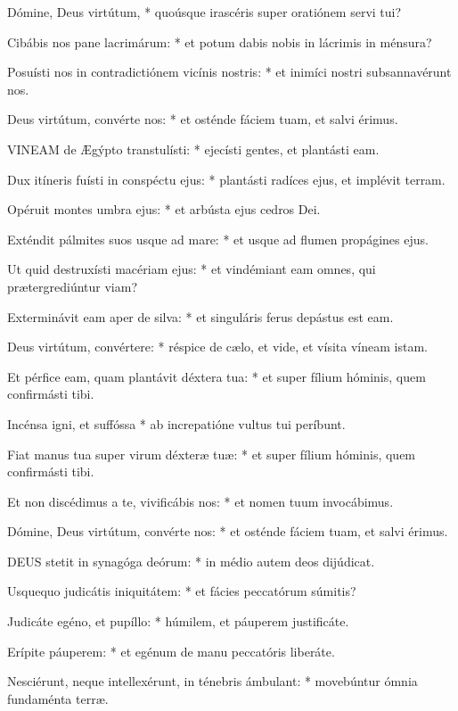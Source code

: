 Dómine, Deus virtútum, * quoúsque irascéris super oratiónem servi tui?

Cibábis nos pane lacrimárum: * et potum dabis nobis in lácrimis in ménsura?

Posuísti nos in contradictiónem vicínis nostris: * et inimíci nostri subsannavérunt nos.

Deus virtútum, convérte nos: * et osténde fáciem tuam, et salvi érimus.


\lettrine[lines=2]{V}{INEAM} de Ægýpto transtulísti: * ejecísti gentes, et plantásti eam.

Dux itíneris fuísti in conspéctu ejus: * plantásti radíces ejus, et implévit terram.

Opéruit montes umbra ejus: * et arbústa ejus cedros Dei.

Exténdit pálmites suos usque ad mare: * et usque ad flumen propágines ejus.

Ut quid destruxísti macériam ejus: * et vindémiant eam omnes, qui prætergrediúntur viam?

Exterminávit eam aper de silva: * et singuláris ferus depástus est eam.

Deus virtútum, convértere: * réspice de cælo, et vide, et vísita víneam istam.

Et pérfice eam, quam plantávit déxtera tua: * et super fílium hóminis, quem confirmásti tibi.

Incénsa igni, et suffóssa * ab increpatióne vultus tui períbunt.

Fiat manus tua super virum déxteræ tuæ: * et super fílium hóminis, quem confirmásti tibi.

Et non discédimus a te, vivificábis nos: * et nomen tuum invocábimus.

Dómine, Deus virtútum, convérte nos: * et osténde fáciem tuam, et salvi érimus.


\lettrine[lines=2]{D}{EUS} stetit in synagóga deórum: * in médio autem deos dijúdicat.

Usquequo judicátis iniquitátem: * et fácies peccatórum súmitis?

Judicáte egéno, et pupíllo: * húmilem, et páuperem justificáte.

Erípite páuperem: * et egénum de manu peccatóris liberáte.

Nesciérunt, neque intellexérunt, in ténebris ámbulant: * movebúntur ómnia fundaménta terræ.

